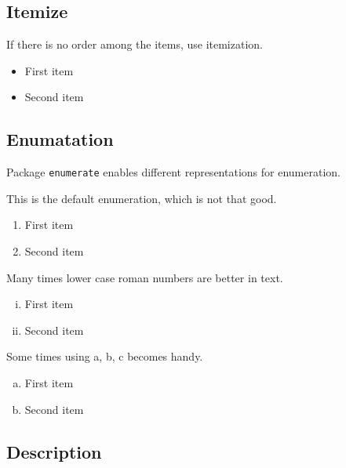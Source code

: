 \documentclass[10pt,journal,compsoc]{IEEEtran}
\newcommand{\hCode}[1]{\texttt{{\footnotesize #1}}}
\theoremstyle{plain}
\theoremstyle{definition}
\theoremstyle{remark}
\begin{document}
\subsection{Itemize}

If there is no order among the items,
use itemization.
\begin{itemize}
	
	\item 
	First item
	
	\item 
	Second item
	
\end{itemize}





\subsection{Enumatation}

Package \hCode{enumerate} enables different representations for enumeration.

This is the default enumeration,
which is not that good.
\begin{enumerate}
	
	\item 
	First item
	
	\item 
	Second item
	
\end{enumerate}

Many times lower case roman numbers are better in text.
\begin{enumerate}[i.]
	
	\item 
	First item
	
	\item 
	Second item
	
\end{enumerate}

Some times using a, b, c becomes handy.
\begin{enumerate}[a.]
	
	\item 
	First item
	
	\item 
	Second item
	
\end{enumerate}




\subsection{Description}
\end{document}
